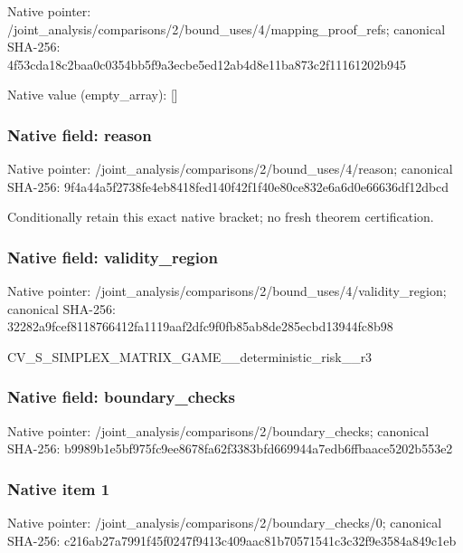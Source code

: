 \documentclass[10pt,a4paper]{article}
\begin{document}
Native pointer: /joint\_analysis/comparis\allowbreak{}ons/2/bound\_uses/4/mappi\allowbreak{}ng\_proof\_refs; canonical SHA-256: 4f53cda18c2baa0c0354bb5f\allowbreak{}9a3ecbe5ed12ab4d8e11ba87\allowbreak{}3c2f11161202b945



Native value (empty\_array): []



\subsubsection{Native field: reason}


Native pointer: /joint\_analysis/comparis\allowbreak{}ons/2/bound\_uses/4/reaso\allowbreak{}n; canonical SHA-256: 9f4a44a5f2738fe4eb8418fe\allowbreak{}d140f42f1f40e80ce832e6a6\allowbreak{}d0e66636df12dbcd


Conditionally retain this exact native bracket; no fresh theorem certification.


\subsubsection{Native field: validity\_region}


Native pointer: /joint\_analysis/comparis\allowbreak{}ons/2/bound\_uses/4/valid\allowbreak{}ity\_region; canonical SHA-256: 32282a9fcef8118766412fa1\allowbreak{}119aaf2dfc9f0fb85ab8de28\allowbreak{}5ecbd13944fc8b98


CV\_S\_SIMPLEX\_MATRIX\_GAME\allowbreak{}\_\_deterministic\_risk\_\_r3


\subsubsection{Native field: boundary\_checks}


Native pointer: /joint\_analysis/comparis\allowbreak{}ons/2/boundary\_checks; canonical SHA-256: b9989b1e5bf975fc9ee8678f\allowbreak{}a62f3383bfd669944a7edb6f\allowbreak{}fbaace5202b553e2



\subsubsection{Native item 1}


Native pointer: /joint\_analysis/comparis\allowbreak{}ons/2/boundary\_checks/0; canonical SHA-256: c216ab27a7991f45f0247f94\allowbreak{}13c409aac81b70571541c3c3\allowbreak{}2f9e3584a849c1eb
\end{document}
